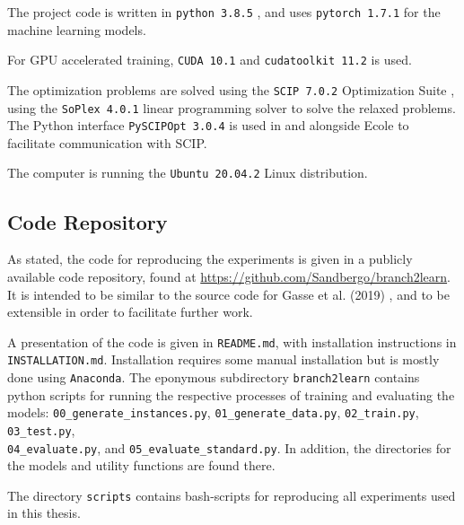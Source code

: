 The project code is written in 
\verb|python 3.8.5| \cite{rossum2009python}, and uses               
\verb|pytorch 1.7.1| \cite{paszke2019pytorch} for the machine learning models.           

For \gls{GPU} accelerated training, 
\verb|CUDA 10.1| and 
\verb|cudatoolkit 11.2| \cite{kirk2008nvidia} is used. 

The optimization problems are solved using the \verb|SCIP 7.0.2| Optimization Suite \cite{gamrath2020scip}, using the 
\verb|SoPlex 4.0.1| \cite{wunderling1996soplex} linear programming solver to solve the relaxed problems. The Python interface
\verb|PySCIPOpt 3.0.4| \cite{maher2016pyscipopt} is used in and alongside \gls{Ecole} to facilitate communication with \gls{SCIP}.

The computer is running the \verb|Ubuntu 20.04.2| Linux distribution.


\subsection{Code Repository}

As stated, the code for reproducing the experiments is given in a publicly available code repository, found at \url{https://github.com/Sandbergo/branch2learn}. It is intended to be similar to the source code for Gasse et al. (2019) \cite{gasse2019exact}, and to be extensible in order to facilitate further work. 

A presentation of the code is given in \verb|README.md|, with installation instructions in \verb|INSTALLATION.md|. Installation requires some manual installation but is mostly done using \verb|Anaconda|. The eponymous subdirectory \verb|branch2learn| contains python scripts for running the respective processes of training and evaluating the models: \verb|00_generate_instances.py|, \verb|01_generate_data.py|, \verb|02_train.py|,
\verb|03_test.py|, \\
\verb|04_evaluate.py|, and \verb|05_evaluate_standard.py|. In addition, the directories for the models and utility functions are found there.

The directory \verb|scripts| contains bash-scripts for reproducing all experiments used in this thesis. 